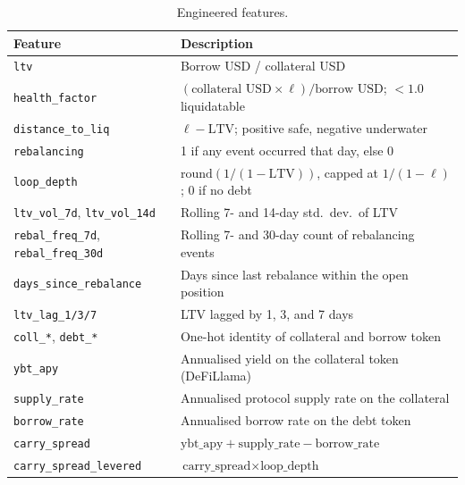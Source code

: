 \begin{table}[t]
\centering
\caption{Engineered features.}
\label{tab:features}
\begin{tabular}{ll}
\hline
Feature & Description \\
\hline
\texttt{ltv} & Borrow USD / collateral USD \\
\texttt{health\_factor} & $(\text{collateral USD} \times \ell)/\text{borrow USD}$; $<1.0$ liquidatable \\
\texttt{distance\_to\_liq} & $\ell - \mathrm{LTV}$; positive safe, negative underwater \\
\texttt{rebalancing} & 1 if any event occurred that day, else 0 \\
\texttt{loop\_depth} & $\mathrm{round}(1/(1-\mathrm{LTV}))$, capped at $1/(1-\ell)$; 0 if no debt \\
\texttt{ltv\_vol\_7d}, \texttt{ltv\_vol\_14d} & Rolling 7- and 14-day std.\ dev.\ of LTV \\
\texttt{rebal\_freq\_7d}, \texttt{rebal\_freq\_30d} & Rolling 7- and 30-day count of rebalancing events \\
\texttt{days\_since\_rebalance} & Days since last rebalance within the open position \\
\texttt{ltv\_lag\_1/3/7} & LTV lagged by 1, 3, and 7 days \\
\texttt{coll\_*}, \texttt{debt\_*} & One-hot identity of collateral and borrow token \\
\texttt{ybt\_apy} & Annualised yield on the collateral token (DeFiLlama) \\
\texttt{supply\_rate} & Annualised protocol supply rate on the collateral \\
\texttt{borrow\_rate} & Annualised borrow rate on the debt token \\
\texttt{carry\_spread} & $\text{ybt\_apy} + \text{supply\_rate} - \text{borrow\_rate}$ \\
\texttt{carry\_spread\_levered} & $\text{carry\_spread} \times \text{loop\_depth}$ \\
\hline
\end{tabular}
\end{table}